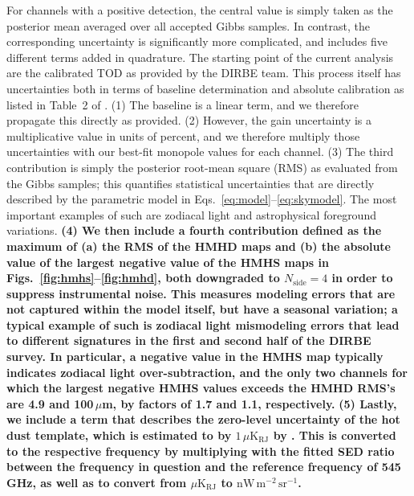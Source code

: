 \documentclass{aa}
\newcommand{\nWmsr}{\mathrm{nW}\,\mathrm{m}^{-2}\,\mathrm{sr}^{-1}}
\begin{document}
For channels with a positive detection, the central value is simply
taken as the posterior mean averaged over all accepted Gibbs
samples. In contrast, the corresponding uncertainty is significantly
more complicated, and includes five different terms added in
quadrature.  The starting point of the current analysis are the
calibrated TOD as provided by the DIRBE team. This process itself has
uncertainties both in terms of baseline determination and absolute
calibration as listed in Table~2 of \citet{hauser1998}. (1) The
baseline is a linear term, and we therefore propagate this directly as
provided. (2) However, the gain uncertainty is a multiplicative value
in units of percent, and we therefore multiply those uncertainties
with our best-fit monopole values for each channel.  (3) The third
contribution is simply the posterior root-mean square (RMS) as
evaluated from the Gibbs samples; this quantifies statistical
uncertainties that are directly described by the parametric model in
Eqs.~\eqref{eq:model}--\eqref{eq:skymodel}. The most important
examples of such are zodiacal light and astrophysical foreground
variations. \textbf{(4) We then include a fourth contribution defined as the
maximum of (a) the RMS of the HMHD maps and (b) the absolute value of the largest negative value of the HMHS maps in Figs.~\ref{fig:hmhs}--\ref{fig:hmhd}, both downgraded to $N_{\mathrm{side}}=4$ in order to
suppress instrumental noise. This measures modeling errors that are
not captured within the model itself, but have a seasonal variation; a
typical example of such is zodiacal light mismodeling errors that lead
to different signatures in the first and second half of the DIRBE
survey. In particular, a negative value in the HMHS map typically indicates zodiacal light over-subtraction, and the only two channels for which the largest negative HMHS values exceeds the HMHD RMS's are 4.9 and 100$\,\mu$m, by factors of 1.7 and 1.1, respectively.} \textbf{(5) Lastly, we include a term that describes the zero-level
uncertainty of the hot dust template, which is estimated to by
$1\,\mu\mathrm{K}_{\mathrm{RJ}}$ by \citet{CG02_06}. This is converted
to the respective frequency by multiplying with the fitted SED ratio
between the frequency in question and the reference frequency of
545\,GHz, as well as to convert from $\mu\mathrm{K}_{\mathrm{RJ}}$ to
$\nWmsr$.}
\end{document}
